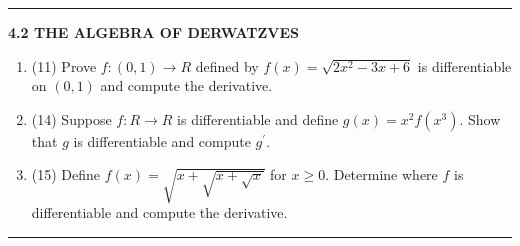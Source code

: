 \documentclass[fleqn]{article}
\begin{document}

  \rule{15cm}{1pt}

  \textbf{4.2  THE ALGEBRA OF DERWATZVES}
  \begin{enumerate}
    \item (11) Prove $f: (0, 1) \longrightarrow R$ defined by $f(x)=\sqrt{2x^2-3x+6}$ is differentiable on $(0, 1)$ and 
    compute the derivative.



    \item (14) Suppose $f: R \longrightarrow R$ is differentiable and define $g(x)=x^2 f(x^3)$. Show that $g$ is
    differentiable and compute $g^'$.


    
    \item (15) Define $f(x)=\sqrt{x+\sqrt{x+\sqrt{x}}}$ for $x \geq 0$. Determine where $f$ is differentiable and compute
    the derivative. 



  \end{enumerate}

  \rule{15cm}{1pt}
\end{document}
